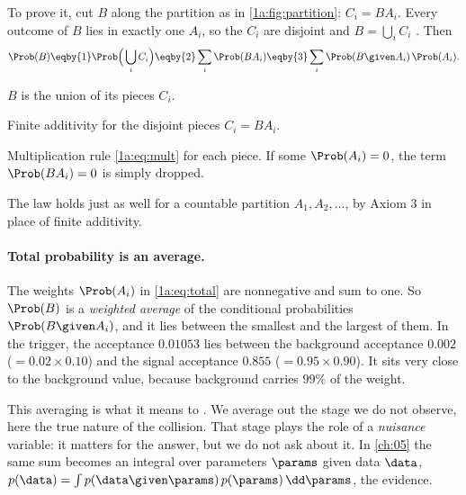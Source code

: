 To prove it, cut $B$ along the partition as in \cref{1a:fig:partition}:
$C_i=BA_i$. Every outcome of $B$ lies in exactly one $A_i$, so the $C_i$ are
disjoint and $B=\bigcup_iC_i$ . Then
\begin{align*}
\Prob(B)\eqby{1}\Prob\Bigl(\,\bigcup_iC_i\Bigr)\eqby{2}\sum_i\Prob(BA_i)\eqby{3}\sum_i\Prob(B\given A_i)\,\Prob(A_i).
\end{align*}
\begin{explain}
  \item $B$ is the union of its pieces $C_i$.
  \item Finite additivity for the disjoint pieces $C_i=BA_i$.
  \item Multiplication rule \eqref{1a:eq:mult} for each piece. If some
        $\Prob(A_i)=0$, the term $\Prob(BA_i)=0$ is simply dropped.
\end{explain}
The law holds just as well for a countable partition $A_1,A_2,\dots$, by
Axiom 3 in place of finite additivity.

\paragraph{Total probability is an average.}
The weights $\Prob(A_i)$ in \eqref{1a:eq:total} are nonnegative and sum to
one. So $\Prob(B)$ is a \emph{weighted average} of the conditional probabilities
$\Prob(B\given A_i)$, and it lies between the smallest and the largest of them.
In the trigger, the acceptance $0.01053$ lies between the background acceptance
$0.002$ ($=0.02\times0.10$) and the signal acceptance $0.855$
($=0.95\times0.90$). It sits very close to the background value, because
background carries $99\%$ of the weight.

This averaging is what it means to . We average out the
stage we do not observe, here the true nature of the collision. That stage
plays the role of a \emph{nuisance} variable: it matters for the answer, but we
do not ask about it. In \cref{ch:05} the same sum becomes an integral over
parameters $\params$ given data $\data$,
$p(\data)=\int p(\data\given\params)\,p(\params)\,\dd\params$, the evidence.

